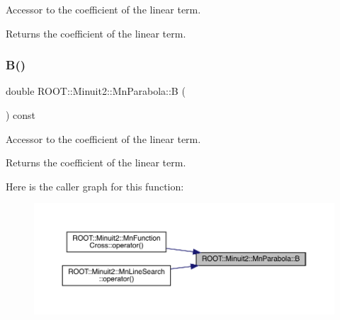 Accessor to the coefficient of the linear term.

\begin{DoxyReturn}{Returns}
the coefficient of the linear term. 
\end{DoxyReturn}
\mbox{\label{classROOT_1_1Minuit2_1_1MnParabola_a878824850afd7ec98fd8685bec89784b}} 
\subsubsection{\texorpdfstring{B()}{B()}\hspace{0.1cm}{\footnotesize\ttfamily [2/3]}}
{\footnotesize\ttfamily double R\+O\+O\+T\+::\+Minuit2\+::\+Mn\+Parabola\+::B (\begin{DoxyParamCaption}{ }\end{DoxyParamCaption}) const\hspace{0.3cm}{\ttfamily [inline]}}

Accessor to the coefficient of the linear term.

\begin{DoxyReturn}{Returns}
the coefficient of the linear term. 
\end{DoxyReturn}
Here is the caller graph for this function\+:
\nopagebreak
\begin{figure}[H]
\begin{center}
\leavevmode
\includegraphics[width=350pt]{db/d7d/classROOT_1_1Minuit2_1_1MnParabola_a878824850afd7ec98fd8685bec89784b_icgraph}
\end{center}
\end{figure}
\mbox{\label{classROOT_1_1Minuit2_1_1MnParabola_a878824850afd7ec98fd8685bec89784b}} 
